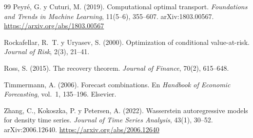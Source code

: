\begin{thebibliography}{99}
Peyré, G. y Cuturi, M. (2019). Computational optimal transport. \emph{Foundations and Trends in Machine
Learning}, 11(5--6), 355--607. arXiv:1803.00567. \url{https://arxiv.org/abs/1803.00567}

Rockafellar, R.~T. y Uryasev, S. (2000). Optimization of conditional value-at-risk. \emph{Journal of
Risk}, 2(3), 21--41.

Ross, S. (2015). The recovery theorem. \emph{Journal of Finance}, 70(2), 615--648.

Timmermann, A. (2006). Forecast combinations. En \emph{Handbook of Economic Forecasting}, vol.~1,
135--196. Elsevier.

Zhang, C., Kokoszka, P. y Petersen, A. (2022). Wasserstein autoregressive models for density time series.
\emph{Journal of Time Series Analysis}, 43(1), 30--52. arXiv:2006.12640. \url{https://arxiv.org/abs/2006.12640}

\end{thebibliography}

